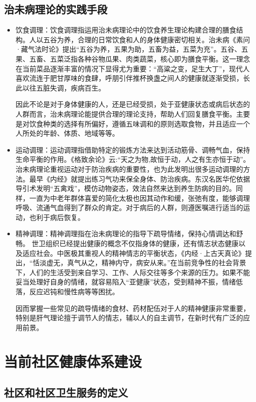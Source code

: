\subsection{治未病理论的实践手段}
\begin{itemize}
\item 饮食调理：饮食调理指运用治未病理论中的饮食养生理论构建合理的膳食结构。人以五谷为养，合理的日常饮食和人的身体健康密切相关。治未病《素问·藏气法时论》提出“五谷为养，五果为助，五畜为益，五菜为充”。五谷、五果、五畜、五菜泛指各种谷物瓜果、肉类蔬菜，核心即为膳食平衡。这一理念在当前菜品逐渐丰富的情况下显得尤为重要：“高粱之变，足生大丁”，现代人喜欢流连于肥甘厚味的食肆，呼朋引伴推杯换盏之间人的健康就逐渐受损，长此以往五脏失调，疾病百生。

因此不论是对于身体健康的人，还是已经受损，处于亚健康状态或病后状态的人群而言，治未病理论能提供合理的理论支持，帮助人们回复膳食平衡。主要是对饮食种类的选择有所偏好，遵循五味调和的原则选取食物，并且适应一个人所处的年龄、体质、地域等等。
\item 运动调理：运动调理指借助特定的锻炼方法来达到活动筋骨、调畅气血，保持生命平衡的作用。《格致余论》云:“天之为物,故恒于动，人之有生亦恒于动”。治未病理论重视运动对于防治疾病的重要性，也为此发明出很多运动调理的方法。最早《内经》就提出练习气功来保全身体、防治疾病。东汉名医华佗依据导引术发明“五禽戏”，模仿动物姿态，效法自然来达到养生防病的目的。同样，一直为中老年群体喜爱的简化太极也因其动作和缓，张弛有度，能够调理呼吸、流通气血得到了群众的肯定。对于病后的人群，则遵医嘱进行适当的运动，也利于病后恢复。

\item 精神调理：精神调理指在治未病理论的指导下疏导情绪，保持心情调达和舒畅。
世卫组织已经提出健康的概念不仅指身体的健康，还有情志状态健康以及适应社会。中医极其重视人的精神情志的平衡状态，《内经·上古天真论》提出，“恬淡虚无，真气从之，精神内守，病安从来。”在当前竞争性的社会背景下，人们的生活受到来自学习、工作、人际交往等多个来源的压力。如果不能妥当处理好自身的情绪，就容易陷入“亚健康”状态，受到精神不振，情绪低落，反应迟钝和慢性病等等困扰。

因而掌握一些常见的疏导情绪的食材、药材配伍对于人的精神健康非常重要，特别是肝气理论擅于调节人的情志，辅以人的自主调节，在新时代有广泛的应用前景。
\end{itemize}

\section{当前社区健康体系建设}
\subsection{社区和社区卫生服务的定义}
